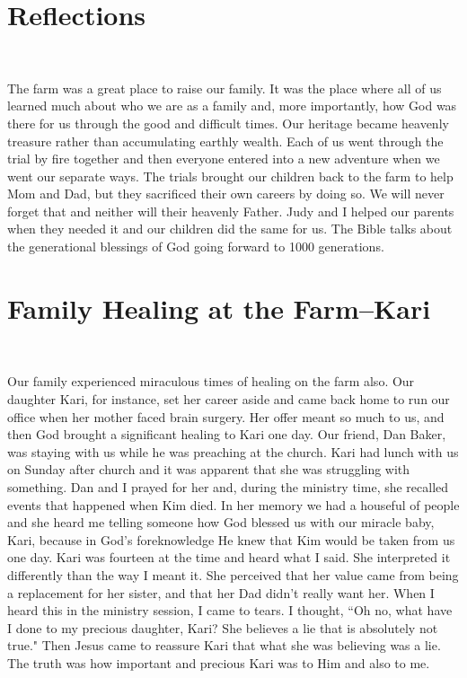 \documentclass[oneside,12pt]{book}
\begin{document}
\section{Reflections}
\

The farm was a great place to raise our family. It was the place where all of us learned much about who we are as a family and, more importantly, how God was there for us through the good and difficult times. Our heritage became heavenly treasure rather than accumulating earthly wealth. Each of us went through the trial by fire together and then everyone entered into a new adventure when we went our separate ways. The trials brought our children back to the farm to help Mom and Dad, but they sacrificed their own careers by doing so. We will never forget that and neither will their heavenly Father. Judy and I helped our parents when they needed it and our children did the same for us. The Bible talks about the generational blessings of God going forward to 1000 generations.


\section{Family Healing at the Farm--Kari}
\

Our family experienced miraculous times of healing on the farm also. Our daughter Kari, for instance, set her career aside and came back home to run our office when her mother faced brain surgery. Her offer meant so much to us, and then God brought a significant healing to Kari one day. Our friend, Dan Baker, was staying with us while he was preaching at the church. Kari had lunch with us on Sunday after church and it was apparent that she was struggling with something. Dan and I prayed for her and, during the ministry time, she recalled events that happened when Kim died. In her memory we had a houseful of people and she heard me telling someone how God blessed us with our miracle baby, Kari, because in God's foreknowledge He knew that Kim would be taken from us one day. Kari was fourteen at the time and heard what I said. She interpreted it differently than the way I meant it. She perceived that her value came from being a replacement for her sister, and that her Dad didn't really want her. When I heard this in the ministry session, I came to tears. I thought, ``Oh no, what have I done to my precious daughter, Kari? She believes a lie that is absolutely not true." Then Jesus came to reassure Kari that what she was believing was a lie. The truth was how important and precious Kari was to Him and also to me. 
\end{document}
